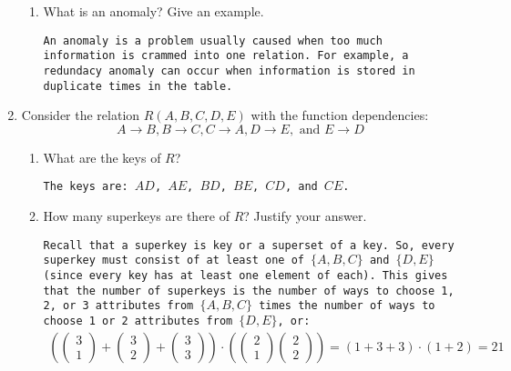 \documentclass[12pt]{article}
\begin{document}
\begin{enumerate}
\begin{enumerate}
    \item What is an anomaly?  Give an example.

	{\tt An anomaly is a problem usually caused when too much 
	information is crammed into one relation.  For example, a 
	redundacy anomaly can occur when information is stored in
	duplicate times in the table.}
\end{enumerate}

\item Consider the relation $R(A,B,C,D,E)$ with the function
dependencies: 
$$
	A\rightarrow B,
	B\rightarrow C,
	C \rightarrow A,
	D \rightarrow E, \mbox{ and }
	E\rightarrow D
$$
\begin{enumerate}
    \item What are the keys of $R$?  

	{\tt The keys are: $AD$, $AE$, $BD$, $BE$, $CD$, and $CE$.}

    \item How many superkeys are there of $R$?  Justify your answer.

	{\tt Recall that a superkey is key or a superset of a key.
	So, every superkey must consist of at least one of $\{A,B,C\}$
	and $\{D,E\}$ (since every key has at least one element of
	each).  This gives that the number of superkeys is the number
	of ways to choose 1, 2, or 3 attributes from $\{A,B,C\}$ times
	the number of ways to choose 1 or 2 attributes from $\{D,E\}$, or:
	$$
	\begin{array}{c}
		\left(
		\left( \begin{array}{c} 3 \\ 1 \end{array} \right)
		+ \left( \begin{array}{c} 3 \\ 2 \end{array} \right)
		+ \left( \begin{array}{c} 3 \\ 3 \end{array} \right)
		\right)
		\cdot
		\left(
		\left( \begin{array}{c} 2 \\ 1 \end{array} \right)
		\left( \begin{array}{c} 2 \\ 2 \end{array} \right)
		\right)
		
		= (1+3+3)\cdot(1+2)
		= 21
	\end{array}
	$$
	
}
\end{enumerate}
\end{enumerate}
\end{document}
